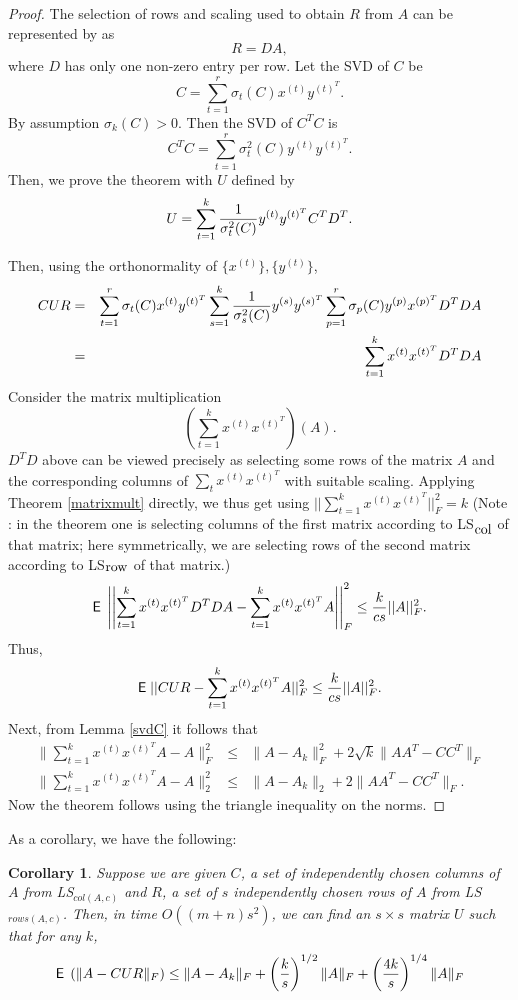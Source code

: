 \documentclass{book}
\newtheorem{corollary}[theorem]{Corollary}
\numberwithin{exercise}{chapter}
\begin{document}
\begin{proof}
The selection of rows and scaling used to obtain $R$ from $A$ can be represented by as
$$R=DA,$$
where $D$ has only one non-zero entry per row.
Let the SVD of $C$ be
$$C=\sum_{t=1}^r \sigma_t(C)x^{(t)}y^{(t)^T}.$$
By assumption $\sigma_k(C)> 0$.
Then the SVD of $C^TC$ is
$$C^TC=\sum_{t=1}^r\sigma_t^2(C) y^{(t)}y^{(t)^T}.$$
Then, we prove the theorem with $U$ defined by
$$U= \sum_{t=1}^k{1\over\sigma_t^2(C)}y^{(t)}y^{(t)^T}C^TD^T.$$

Then, using the orthonormality of $\{ x^{(t)}\},\{ y^{(t)}\}$,
\begin{eqnarray*}
CUR&=&\sum_{t=1}^r\sigma_t(C)x^{(t)}y^{(t)^T}\sum_{s=1}^k{1\over\sigma_s^2(C)}y^{(s)}y^{(s)^T}\sum_{p=1}^r\sigma_p(C)y^{(p)}x^{(p)^T}D^TDA\\
&=&\sum_{t=1}^k x^{(t)}x^{(t)^T}D^TDA
\end{eqnarray*}
Consider the
matrix multiplication
$$\left( \sum_{t=1}^kx^{(t)}x^{(t)^T}\right)\left( A\right).$$
$D^TD$ above can be viewed precisely as selecting some rows of the matrix $A$ and the corresponding columns of
$\sum_tx^{(t)}x^{(t)^T}$ with suitable scaling. Applying Theorem \ref{matrixmult} directly, we thus get
using $||\sum_{t=1}^kx^{(t)}x^{(t)^T}||_F^2=k$ (Note : in the theorem one is selecting columns of the first matrix according to LS$_{\hbox{col}}$ of that matrix; here symmetrically, we are selecting rows of the second matrix according to LS$_{\hbox{row}}$ of that matrix.)
$$\hbox{{\sf E}\;}\left|\left| \sum_{t=1}^k x^{(t)}x^{(t)^T}D^TDA - \sum_{t=1}^k x^{(t)}x^{(t)^T}A\right|\right|_F^2\leq {k\over cs}||A||_F^2.$$
Thus,
$$\hbox{{\sf E}\;}||CUR-\sum_{t=1}^k x^{(t)}x^{(t)^T}A||_F^2\leq {k\over cs}||A||_F^2.$$
Next, from Lemma \ref{svdC} it follows that
\begin{eqnarray*}
\|\sum_{t=1}^k x^{(t)}x^{(t)^T}A-A\|_F^2&\leq& \|A-A_k\|_F^2+2\sqrt{k}\|AA^T-CC^T\|_F \\
\|\sum_{t=1}^k x^{(t)}x^{(t)^T}A-A\|_2^2&\leq& \|A-A_k\|_2+2\|AA^T-CC^T\|_F.
\end{eqnarray*}
Now the theorem follows using the triangle inequality on the norms.
\end{proof}

As a corollary, we have the following:
\begin{corollary}\label{cor:CUR}
Suppose we are given $C$, a set of independently chosen columns of $A$ from LS$_{col(A,c)}$ and $R$, a set of $s$ independently chosen rows of $A$ from LS$_{rows(A,c)}$. Then, in time $O((m+n)s^2)$, we can find an $s \times s$ matrix $U$ such that for any $k$,
\[
\hbox{{\sf E}\;}\left(\|A-CUR\|_F\right) \leq \|A-A_k\|_F + \left(\frac{k}{s}\right)^{1/2}\|A\|_F + \left(\frac{4k}{s}\right)^{1/4}\|A\|_F
\]
\end{corollary}
\end{document}

